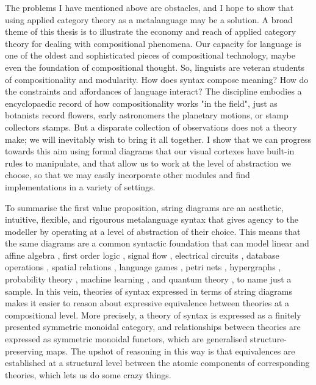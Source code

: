 The problems I have mentioned above are obstacles, and I hope to show that using applied category theory as a metalanguage may be a solution. A broad theme of this thesis is to illustrate the economy and reach of applied category theory for dealing with compositional phenomena. Our capacity for language is one of the oldest and sophisticated pieces of compositional technology, maybe even the foundation of compositional thought. So, linguists are veteran students of compositionality and modularity. How does syntax compose meaning? How do the constraints and affordances of language interact? The discipline embodies a encyclopaedic record of how compositionality works "in the field", just as botanists record flowers, early astronomers the planetary motions, or stamp collectors stamps. But a disparate collection of observations does not a theory make; we will inevitably wish to bring it all together. I show that we can progress towards this aim using formal diagrams that our visual cortexes have built-in rules to manipulate, and that allow us to work at the level of abstraction we choose, so that we may easily incorporate other modules and find implementations in a variety of settings.

To summarise the first value proposition, string diagrams are an aesthetic, intuitive, flexible, and rigourous metalanguage syntax that gives agency to the modeller by operating at a level of abstraction of their choice. This means that the same diagrams are a common syntactic foundation that can model linear and affine algebra \citep{}, first order logic \citep{}, signal flow \citep{}, electrical circuits \citep{}, database operations \citep{}, spatial relations \citep{}, language games \citep{}, petri nets \citep{}, hypergraphs \citep{}, probability theory \citep{}, machine learning \citep{}, and quantum theory \citep{}, to name just a sample. In this vein, theories of syntax expressed in terms of string diagrams makes it easier to reason about expressive equivalence between theories at a compositional level. More precisely, a theory of syntax is expressed as a finitely presented symmetric monoidal category, and relationships between theories are expressed as symmetric monoidal functors, which are generalised structure-preserving maps. The upshot of reasoning in this way is that equivalences are established at a structural level between the atomic components of corresponding theories, which lets us do some crazy things.

